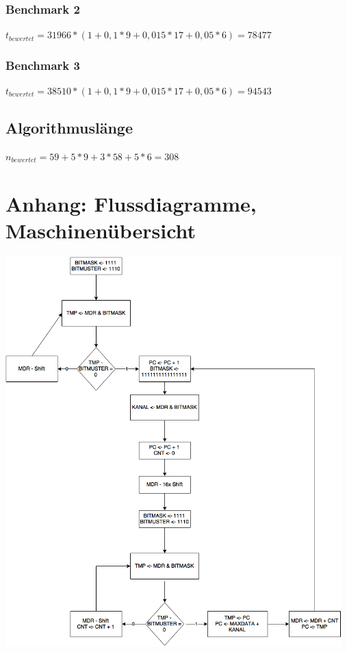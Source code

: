 \documentclass[12pt,titlepage,german,a4]{article}
\begin{document}
    \subsubsection{Benchmark 2}
    $t_{bewertet} = 31966 * (1 + 0,1*9 + 0,015*17 + 0,05*6) = 78477$

    \subsubsection{Benchmark 3}
    $t_{bewertet} = 38510 * (1 + 0,1*9 + 0,015*17 + 0,05*6) = 94543$

    \subsection{Algorithmusl{\"a}nge}
    $n_{bewertet} = 59 + 5 * 9 + 3 * 58 + 5 * 6 = 308$


    \newpage

    \section{Anhang: Flussdiagramme, Maschinen{\"u}bersicht}
	\includegraphics[width=13cm]{img/algoComplete.png} \\
	\newpage
\end{document}
